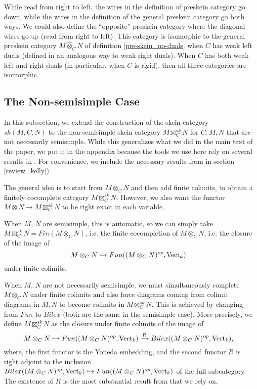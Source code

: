 \begin{remark}
  While read from right to left, the wires in the definition of preskein
  category go down, while the wires in the definition of the general preskein
  category go both ways. We could also define the ``opposite'' preskein
  category where the diagonal wires go up (read from right to left). This
  category is isomorphic to the general preskein category $M \hat{\otimes}_C
  N$ of definition \ref{pre-skein_no-duals} when $C$ has weak left duals
  (defined in an analogous way to weak right duals). When $C$ has both weak
  left and right duals (in particular, when $C$ is rigid), then all three
  categories are isomorphic.
\end{remark}

\subsection{The Non-semisimple Case} \label{section-nonsemisimple}

In this subsection, we extend the construction of the skein category
$sk(M,C,N)$ to the non-semisimple skein category $M \boxtimes_C^{sk} N$ for
$C, M, N$ that are not necessarily semisimple. While this generalizes what we
did in the main text of the paper, we put it in the appendix because the tools
we use here rely on several results in
\cite{kelly/basic-concepts-enriched}. For convenience, we include the
necessary results from \cite{kelly/basic-concepts-enriched} in section \ref{review_kelly})

\noindent The general idea is to start from $M\otimes_C N$ and then add finite
colimits, to obtain a finitely cocomplete category $M\boxtimes_C^{sk} N$.
However, we also want the functor $M\otimes N \to M\boxtimes^{sk}_C N$ to be
right exact in each variable.

When $M$, $N$ are semisimple, this is automatic, so we can simply take
$M\boxtimes_C^{sk} N = Fin(M\otimes_C N)$, i.e. the finite cocompletion of
$M\otimes_C N$, i.e. the closure of the image of $$M\otimes_C N\hookrightarrow
Fun((M\otimes_C N)^{op},\operatorname{Vect}_k)$$ under finite colimits.

When $M$, $N$ are not necessarily semisimple, we must simultaneously complete
$M\otimes_C N$ under finite colimits and also force diagrams coming from
colimit diagrams in $M, N$ to become colimits in $M \boxtimes_C^{sk} N$. This
is achieved by changing from $Fun$ to $Bilex$ (both are the same in the
semisimple case). More precisely, we define $M\boxtimes_C^{sk} N$ as the
closure under finite colimits of the image of
\[
  M \otimes_C N
  \hookrightarrow
  Fun((M\otimes_C N)^{op},\operatorname{Vect}_k)
  \xrightarrow{R}
  Bilex((M\otimes_C N)^{op},\operatorname{Vect}_k),
\]
where, the first functor is the Yoneda embedding, and the second functor $R$
is right adjoint to the inclusion $Bilex((M\otimes_C N)^{op},\operatorname{Vect}_k)
\hookrightarrow Fun((M\otimes_C N)^{op},\operatorname{Vect}_k)$ of the full subcategory. The
existence of $R$ is the most substantial result from
\cite{kelly/basic-concepts-enriched} that we rely on.

